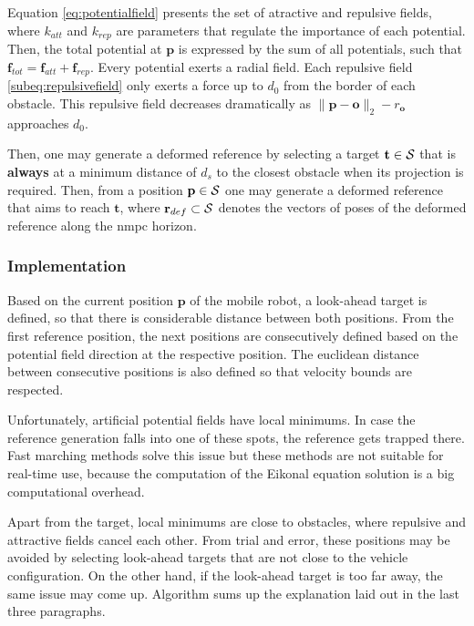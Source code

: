 Equation \eqref{eq:potentialfield} presents the set of atractive and repulsive fields, where $k_{att}$ and $k_{rep}$ are parameters that regulate the importance of each potential. Then, the total potential at $\mathbf{p}$ is expressed by the sum of all potentials, such that $\mathbf{f}_{tot} = \mathbf{f}_{att} + \mathbf{f}_{rep}$. Every potential exerts a radial field. Each repulsive field \eqref{subeq:repulsivefield} only exerts a force up to $d_0$ from the border of each obstacle. This repulsive field decreases dramatically as $\|\mathbf{p} - \mathbf{o}\|_2-r_\mathbf{o}$ approaches $d_0$.

Then, one may generate a deformed reference by selecting a target $\mathbf{t} \in \mathcal{S}$ that is \textbf{always} at a minimum distance of $d_s$ to the closest obstacle when its projection is required. Then, from a position $\mathbf{p} \in \mathcal{S}$ one may generate a deformed reference that aims to reach $\mathbf{t}$, where $\mathbf{r}_{def} \subset \mathcal{S}$ denotes the vectors of poses of the deformed reference along the \acrshort{nmpc} horizon.

\subsubsection*{Implementation}

Based on the current position $\mathbf{p}$ of the mobile robot, a look-ahead target is defined, so that there is considerable distance between both positions. From the first reference position, the next positions are consecutively defined based on the potential field direction at the respective position. The euclidean distance between consecutive positions is also defined so that velocity bounds are respected.

Unfortunately, artificial potential fields have local minimums. In case the reference generation falls into one of these spots, the reference gets trapped there. Fast marching methods solve this issue but these methods are not suitable for real-time use, because the computation of the Eikonal equation solution is a big computational overhead.

Apart from the target, local minimums are close to obstacles, where repulsive and attractive fields cancel each other. From trial and error, these positions may be avoided by selecting look-ahead targets that are not close to the vehicle configuration. On the other hand, if the look-ahead target is too far away, the same issue may come up. Algorithm  sums up the explanation laid out in the last three paragraphs. 

